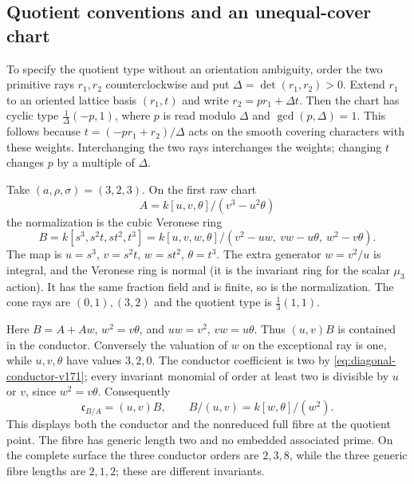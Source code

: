 \subsection{Quotient conventions and an unequal-cover chart}
To specify the quotient type without an orientation ambiguity, order
the two primitive rays $r_1,r_2$ counterclockwise and put
$\Delta=\det(r_1,r_2)>0$. Extend $r_1$ to an oriented lattice basis
$(r_1,t)$ and write $r_2=pr_1+\Delta t$. Then the chart has cyclic
type $\frac1\Delta(-p,1)$, where $p$ is read modulo $\Delta$ and
$\gcd(p,\Delta)=1$. This follows because
$t=(-p r_1+r_2)/\Delta$ acts on the smooth covering characters with
these weights. Interchanging the two rays interchanges the weights;
changing $t$ changes $p$ by a multiple of $\Delta$.

\begin{example}
\label{ex:unequal-cover-v171}
Take $(a,\rho,\sigma)=(3,2,3)$. On the first raw chart
\[
 A=k[u,v,\theta]/(v^3-u^2\theta)
\]
the normalization is the cubic Veronese ring
\[
 B=k[s^3,s^2t,st^2,t^3]
   =k[u,v,w,\theta]/(v^2-uw,\ vw-u\theta,\ w^2-v\theta).
\]
The map is $u=s^3$, $v=s^2t$, $w=st^2$, $\theta=t^3$.
The extra generator $w=v^2/u$ is integral, and the Veronese ring is
normal (it is the invariant ring for the scalar $\mu_3$ action).
It has the same fraction field and is finite, so is the normalization.
The cone rays are $(0,1),(3,2)$ and the quotient type is
$\frac13(1,1)$.

Here $B=A+Aw$, $w^2=v\theta$, and $uw=v^2$, $vw=u\theta$.
Thus $(u,v)B$ is contained in the conductor. Conversely the valuation
of $w$ on the exceptional ray is one, while $u,v,\theta$ have
values $3,2,0$. The conductor coefficient is two by
\eqref{eq:diagonal-conductor-v171}; every invariant monomial of
order at least two is divisible by $u$ or $v$, since $w^2=v\theta$.
Consequently
\[
 \mathfrak c_{B/A}=(u,v)B,\qquad
 B/(u,v)=k[w,\theta]/(w^2).
\]
This displays both the conductor and the nonreduced full fibre at the
quotient point. The fibre has generic length two and no embedded
associated prime. On the complete surface the three conductor orders
are $2,3,8$, while the three generic fibre lengths are $2,1,2$;
these are different invariants.
\end{example}


